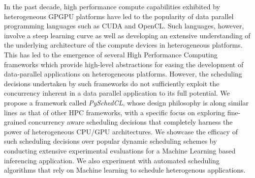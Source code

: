 \documentclass[12pt, a4paper, oneside]{Thesis} %
\begin{document}
{{In the past decade, high performance compute capabilities exhibited by heterogeneous GPGPU platforms have led to the popularity of  data parallel programming languages such as CUDA and OpenCL. Such languages, however,  involve a steep learning curve as well as developing an extensive understanding of the underlying architecture of the compute devices in heterogeneous platforms. This has led to the emergence of several High Performance Computing frameworks which provide high-level abstractions for easing the development of data-parallel applications on heterogeneous platforms. However, the scheduling decisions undertaken by such frameworks do not sufficiently exploit the concurrency inherent in a data parallel application to its full potential. We propose a framework called {\em PySchedCL}, whose design philosophy is along similar lines as that of other HPC frameworks, with a specific focus on exploring fine-grained concurrency aware scheduling decisions that completely harness the power of heterogeneous CPU/GPU architectures. We showcase the efficacy of such scheduling decisions over popular dynamic scheduling schemes by conducting extensive experimental evaluations for a Machine Learning based inferencing application. We also experiment with automated scheduling algorithms that rely on Machine learning to schedule heterogenous applications. 


}

\clearpage %





\acknowledgements{\addtocontents{toc}{}%

I am deeply grateful to my supervisor \textbf{Prof. Soumyajit Dey} who gave me the opportunity to work on this project. I am thankful for his aspiring guidance, invaluably constructive friendly advice during the course of the project. I am sincerely grateful to him for sharing his truthful and illuminating views on a number of issues related to the project. I owe a lot to my teachers in the Department of Computer Science and Engineering, Indian Institute of Technology, Kharagpur, who have instilled in me the scientific spirit of inquiry, experimentation, observation and inference, without which I would not have been able to produce this work. Also, I am very thankful to \textbf{Mr. Anirban Ghose} involved in this project who constantly motivated me to overcome all the challenges and helped me whenever I faced any issues. This thesis is the output of collaborative work and I have therefore used the pronoun 'we' throughout the document to reflect that.  


}}
\end{document}
